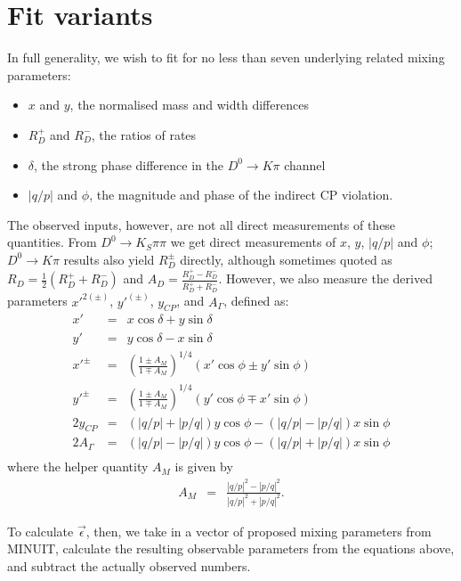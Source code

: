 \section{Fit variants}
\label{sec:fit_variants}
In full generality, we wish to fit for no less than seven underlying
related mixing parameters:
\begin{itemize}
\item $x$ and $y$, the normalised mass and width differences
\item $R_D^+$ and $R_D^-$, the ratios of rates
\item $\delta$, the strong phase difference in the $D^0\to K\pi$ channel
\item $|q/p|$ and $\phi$, the magnitude and phase of the indirect CP violation. 
\end{itemize}
The observed inputs, however, are not all direct measurements of these
quantities. From $D^0\to K_S\pi\pi$ we get direct measurements of $x$, $y$, $|q/p|$ and $\phi$;
$D^0\to K\pi$ results also yield $R_D^\pm$ directly, although sometimes quoted
as $R_D = \frac{1}{2}(R_D^+ + R_D^-)$ and $A_D = \frac{R_D^+ - R_D^-}{R_D^+ + R_D^-}$.
However, we also measure the derived parameters $x'^{2(\pm)}$, $y'^{(\pm)}$, $y_{CP}$, and $A_\Gamma$,
defined as:
\begin{eqnarray}
x' &=& x\cos\delta + y\sin\delta \\
y' &=& y\cos\delta - x\sin\delta \\
x'^{\pm} &=& \left(\frac{1\pm A_M}{1\mp A_M}\right)^{1/4}\left(x'\cos\phi \pm y'\sin\phi\right) \\
y'^{\pm} &=& \left(\frac{1\pm A_M}{1\mp A_M}\right)^{1/4}\left(y'\cos\phi \mp x'\sin\phi\right) \\
2y_{CP}  &=& \left(|q/p|+|p/q|\right)y\cos\phi - \left(|q/p|-|p/q|\right)x\sin\phi\\
2A_\Gamma  &=& \left(|q/p|-|p/q|\right)y\cos\phi - \left(|q/p|+|p/q|\right)x\sin\phi\\
\end{eqnarray}
where the helper quantity $A_M$ is given by
\begin{eqnarray}
A_M &=& \frac{|q/p|^2 - |p/q|^2}{|q/p|^2 + |p/q|^2}. 
\end{eqnarray}

To calculate $\vec\epsilon$, then, we take in a vector of proposed mixing parameters
from MINUIT, calculate the resulting observable parameters from the equations above, 
and subtract the actually observed numbers.

